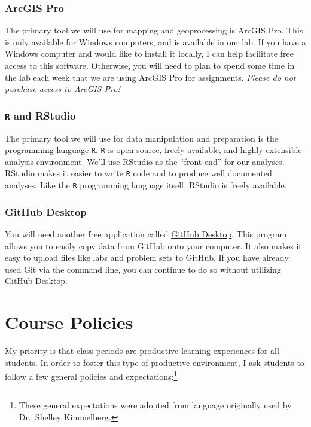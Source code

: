 \documentclass[
]{book}
\begin{document}
\hypertarget{arcgis-pro}{%
\subsection{ArcGIS Pro}\label{arcgis-pro}}

The primary tool we will use for mapping and geoprocessing is ArcGIS Pro. This is only available for Windows computers, and is available in our lab. If you have a Windows computer and would like to install it locally, I can help facilitate free access to this software. Otherwise, you will need to plan to spend some time in the lab each week that we are using ArcGIS Pro for assignments. \emph{Please do not purchase access to ArcGIS Pro!}

\hypertarget{r-and-rstudio}{%
\subsection{\texorpdfstring{\texttt{R} and RStudio}{R and RStudio}}\label{r-and-rstudio}}

The primary tool we will use for data manipulation and preparation is the programming language \texttt{R}. \texttt{R} is open-source, freely available, and highly extensible analysis environment. We'll use \href{https://www.rstudio.com}{RStudio} as the ``front end'' for our analyses. RStudio makes it easier to write \texttt{R} code and to produce well documented analyses. Like the \texttt{R} programming language itself, RStudio is freely available.

\hypertarget{github-desktop}{%
\subsection{GitHub Desktop}\label{github-desktop}}

You will need another free application called \href{https://desktop.github.com}{GitHub Desktop}. This program allows you to easily copy data from GitHub onto your computer. It also makes it easy to upload files like labs and problem sets to GitHub. If you have already used Git via the command line, you can continue to do so without utilizing GitHub Desktop.

\hypertarget{course-policies}{%
\chapter{Course Policies}\label{course-policies}}

My priority is that class periods are productive learning experiences for all students. In order to foster this type of productive environment, I ask students to follow a few general policies and expectations:\footnote{These general expectations were adopted from language originally used by Dr.~Shelley Kimmelberg.}
\end{document}
